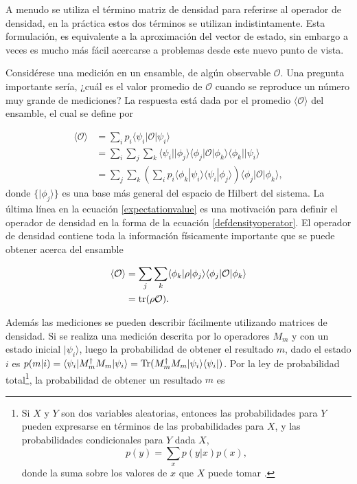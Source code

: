 A menudo se utiliza el término matriz de densidad para referirse al operador de
densidad, en la práctica estos dos términos se utilizan indistintamente. Esta
formulación, es equivalente a la aproximación del vector de estado, sin embargo
a veces es mucho más fácil acercarse a problemas desde este nuevo punto de
vista.
 
Considérese una medición en un ensamble, de algún observable $\mathcal{O}$. Una
pregunta importante sería, ¿cuál es el valor promedio de $\mathcal{O}$ cuando
se reproduce un número muy grande de mediciones? La respuesta está dada por el
promedio $\langle \mathcal{O} \rangle$ del ensamble, el cual se define por
{\cite{sakurai2017modern}}
 
\begin{equation}
 	\label{expectationvalue}
 	 \begin{split}
 		\langle \mathcal{O} \rangle &= \sum_{i}p_i \langle\psi_i|\mathcal{O}|\psi_i\rangle\\
 		&=\sum_i\sum_{j}\sum_k \langle\psi_i||\phi_j\rangle \langle \phi_j|\mathcal{O}|\phi_k\rangle \langle \phi_k||\psi_i\rangle\\
 		&=\sum_{j}\sum_k \left(\sum_{i} p_i \langle \phi_k|\psi_i\rangle  \langle\psi_i|\phi_j\rangle\right) \langle \phi_j|\mathcal{O}|\phi_k\rangle, 
 	\end{split}
\end{equation}
donde $\{|\phi_j\rangle \}$ es una base más general del espacio de Hilbert del
sistema. La última línea en la ecuación {\ref{expectationvalue}} es una
motivación para  definir el operador de densidad  en la forma de la ecuación
{\ref{defdensityoperator}}. El operador de densidad contiene toda la
información físicamente importante que se puede obtener acerca del ensamble
{\cite{sakurai2017modern}} 
 
 \begin{equation}
 	\label{expectationvalue_traza}
 	\begin{split}
 		\langle \mathcal{O} \rangle &=\sum_{j}\sum_k \langle \phi_k|\rho|\phi_j\rangle \langle \phi_j|\mathcal{O}|\phi_k\rangle\\
 		&= \rm{tr}(\rho \mathcal{O}).
 	\end{split}
\end{equation}

	Además las mediciones se pueden describir fácilmente utilizando matrices de densidad. Si se realiza una medición descrita por lo operadores $M_m$ y con un estado inicial $|\psi_i\rangle$, luego la probabilidad de obtener el resultado $m$, dado el estado $i$ es $p(m|i)=\langle \psi_i|M_m^{\dagger}M_m|\psi_i\rangle = {\rm Tr}(M_m^{\dagger} M_m |\psi_i\rangle \langle\psi_i|)$. Por la ley de probabilidad total\footnote{Si  $X$ y $Y$ son dos variables aleatorias, entonces las probabilidades para $Y $ pueden expresarse en términos de las probabilidades para $X$, y las probabilidades condicionales para $ Y$ dada $X$,
		\[p(y) =\sum_x p(y|x)p(x),\] donde la suma sobre los valores de $x$ que $X$ puede tomar {\cite{nielsen_chuang_2010}}.}, la probabilidad de obtener un resultado $m$ es {\cite{nielsen_chuang_2010}}


